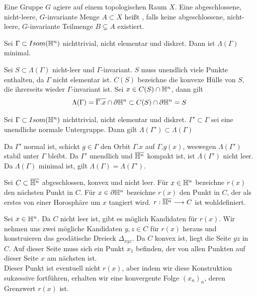 \documentclass{book}
\begin{document}
\Def{}
Eine Gruppe $G$ agiere auf einem topologischen Raum $X$. Eine abgeschlossene, nicht-leere, $G$-invariante Menge $A \subset X$ heißt , falls keine abgeschlossene, nicht-leere, $G$-invariante Teilmenge $B \subsetneq A$ existiert.

\Prop{}
Sei $\Gamma \subset Isom(\mathbb{H}^n)$ nichttrivial, nicht elementar und diskret.
Dann ist $\Lambda(\Gamma)$ minimal.
\begin{Beweis}{}
	Sei $S \subset \Lambda(\Gamma)$ nicht-leer und $\Gamma$-invariant. $S$ muss unendlich viele Punkte enthalten, da $\Gamma$ nicht elementar ist. $C(S)$ bezeichne die konvexe Hülle von $S$, die ihrerseits wieder $\Gamma$-invariant ist. Sei $x \in C(S) \cap \mathbb{H}^n$, dann gilt
	\[ \Lambda(\Gamma) = \overline{\Gamma.x} \cap \partial \mathbb{H}^n \subset C(S) \cap \partial \mathbb{H}^n = S \] 
\end{Beweis}

\Kor{}
Sei $\Gamma \subset Isom(\mathbb{H}^n)$ nichttrivial, nicht elementar und diskret. $\Gamma' \subset \Gamma$ sei eine unendliche normale Untergruppe. Dann gilt $\Lambda(\Gamma') \subset \Lambda(\Gamma)$
\begin{Beweis}{}
	Da $\Gamma'$ normal ist, schickt $g \in \Gamma$ den Orbit $\Gamma.x$ auf $\Gamma.g(x)$, weswegen $\Lambda(\Gamma')$ stabil unter $\Gamma$ bleibt. Da $\Gamma'$ unendlich und $\overline{\mathbb{H}^n}$ kompakt ist, ist $\Lambda(\Gamma')$ nicht leer. Da $\Lambda(\Gamma)$ minimal ist, gilt $\Lambda(\Gamma) = \Lambda(\Gamma')$.
\end{Beweis}

\Lem{}
Sei $C \subset \overline{\mathbb{H}^n}$ abgeschlossen, konvex und nicht leer. Für $x \in \mathbb{H}^n$ bezeichne $r(x)$ den nächsten Punkt in $C$. Für $x\in \partial\mathbb{H}^n$ bezeichne $r(x)$ den Punkt in $C$, der als erstes von einer Horosphäre um $x$ tangiert wird. $r : \overline{\mathbb{H}^n} \overset{}{\longrightarrow} C$ ist wohldefiniert.
\begin{Beweis}{}
	Sei $x\in {\mathbb{H}^n}$. Da $C$ nicht leer ist, gibt es möglich Kandidaten für $r(x)$. Wir nehmen uns zwei mögliche Kandidaten $y,z \in C$ für $r(x)$ heraus und konstruieren das geodätische Dreieck $\Delta_{xyz}$. Da $C$ konvex ist, liegt die Seite $\overline{yz}$ in $C$. Auf dieser Seite muss sich ein Punkt $x_1$ befinden, der von allen Punkten auf dieser Seite $x$ am nächsten ist.\\
	Dieser Punkt ist eventuell nicht $r(x)$, aber indem wir diese Konstruktion sukzessive fortführen, erhalten wir eine konvergente Folge $(x_n)_n$, deren Grenzwert $r(x)$ ist.
\end{Beweis}
\end{document}
